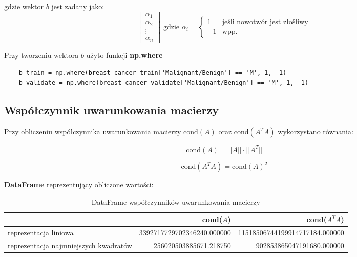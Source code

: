 \documentclass{article}
\begin{document}
gdzie wektor $b$ jest zadany jako:
\begin{equation}
\begin{bmatrix}
    \alpha_1 \\
    \alpha_2 \\
    \vdots \\ 
    \alpha_n
\end{bmatrix}
\text{ gdzie } \alpha_i = \begin{cases}
1 & \text{jeśli nowotwór jest złośliwy} \\
-1 & \text{wpp.}
\end{cases}
\end{equation}

Przy tworzeniu wektora $b$ użyto funkcji \textbf{np.where}

\begin{lstlisting}
    b_train = np.where(breast_cancer_train['Malignant/Benign'] == 'M', 1, -1)
    b_validate = np.where(breast_cancer_validate['Malignant/Benign'] == 'M', 1, -1)
\end{lstlisting}

\subsection{Współczynnik uwarunkowania macierzy}

Przy obliczeniu współczynnika uwarunkowania macierzy $\text{cond}(A)$ oraz $\text{cond}(A^TA)$ wykorzystano równania:

\begin{equation}
    \text{cond}(A) = ||A|| \cdot ||A^T||
\end{equation}

\begin{equation}
    \text{cond}(A^TA) = \text{cond}(A)^2
\end{equation}

\textbf{DataFrame} reprezentujący obliczone wartości:
\begin{table}[!h]
    \begin{adjustbox}{width=420pt,center}
    \centering
    \begin{tabular}{l|r|r}
    \toprule
     & cond($A$) & cond($A^TA$) \\
    \midrule
    reprezentacja liniowa & 3392717729702346240.000000 & 11518506744199914717184.000000 \\
    reprezentacja najmniejszych kwadratów & 256020503885671.218750 &    902853865047191680.000000 \\
    \bottomrule
    \end{tabular}
    \end{adjustbox}
    \caption{DataFrame współczynników uwarunkowania macierzy}
    \label{tab:my_label}
\end{table}
\end{document}
